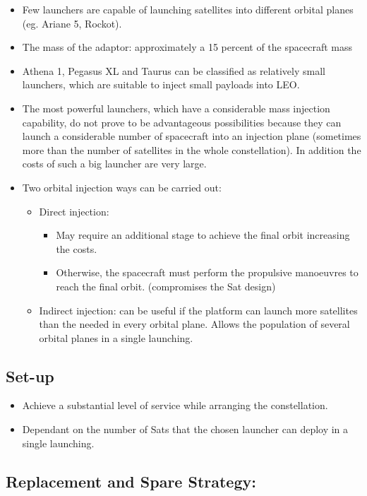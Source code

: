 \documentclass{article}
\begin{document}
\begin{itemize}
\item Few launchers are capable of launching satellites into different orbital planes (eg. Ariane 5, Rockot). 
\item The mass of the adaptor: approximately a 15 percent of the spacecraft mass		
\item Athena 1, Pegasus XL and Taurus can be classified as relatively small launchers, which are suitable to inject small payloads into LEO. 				
\item The most powerful launchers, which have a considerable mass injection capability, do not prove to be advantageous possibilities because they can launch a considerable number of spacecraft into an injection plane (sometimes more than the number of satellites in the whole constellation). In addition the costs of such a big launcher are very large.  
\item Two orbital injection ways can be carried out:
    \begin{itemize}
    \item	Direct injection:
        \begin{itemize}
        \item May require an additional stage to achieve the final orbit increasing the costs. 
        \item Otherwise, the spacecraft must perform the propulsive manoeuvres to reach the final orbit. (compromises the Sat design)
        \end{itemize}
    \item	Indirect injection: can be useful if the platform can launch more satellites than the needed in every orbital plane. Allows the population of several orbital planes in a single launching. 
    \end{itemize}
\end{itemize}

\subsection{Set-up}

\begin{itemize}
\item Achieve a substantial level of service while arranging the constellation.
\item Dependant on the number of Sats that the chosen launcher can deploy in a single launching. 
\end{itemize}

\subsection{Replacement and Spare Strategy: }
\end{document}

